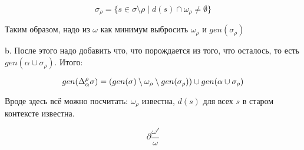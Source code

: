             $$\sigma_\rho=\{s\in\sigma\setminus\rho \mid d(s)\cap\omega_\rho\ne\emptyset\}$$
			
          Таким образом, надо из $\omega$ как минимум выбросить $\omega_\rho$ и $gen(\sigma_\rho)$

		b. После этого надо добавить что, что порождается из того, что осталось, то есть $gen(\alpha\cup\sigma_\rho)$. Итого:

			$$gen(\Delta_\alpha^\rho\sigma)=(gen(\sigma)\setminus\omega_\rho\setminus gen(\sigma_\rho))\cup gen(\alpha\cup\sigma_\rho)$$

     Вроде здесь всё можно посчитать: $\omega_\rho$ известна, $d(s)$ для всех $s$ в старом контексте известна. 
	 
$$\partial\dfrac{\omega'}{\omega}$$
